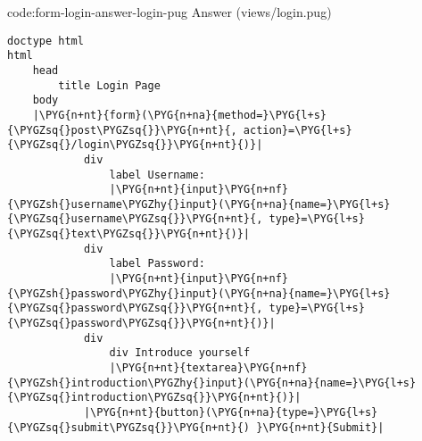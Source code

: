 \begin{code}{code:form-login-answer-login-pug}{ Answer (views/login.pug)}
\begin{verbatim}
doctype html
html
    head
        title Login Page
    body
    |\PYG{n+nt}{form}(\PYG{n+na}{method=}\PYG{l+s}{\PYGZsq{}post\PYGZsq{}}\PYG{n+nt}{, action}=\PYG{l+s}{\PYGZsq{}/login\PYGZsq{}}\PYG{n+nt}{)}|
            div
                label Username:
                |\PYG{n+nt}{input}\PYG{n+nf}{\PYGZsh{}username\PYGZhy{}input}(\PYG{n+na}{name=}\PYG{l+s}{\PYGZsq{}username\PYGZsq{}}\PYG{n+nt}{, type}=\PYG{l+s}{\PYGZsq{}text\PYGZsq{}}\PYG{n+nt}{)}|
            div
                label Password:
                |\PYG{n+nt}{input}\PYG{n+nf}{\PYGZsh{}password\PYGZhy{}input}(\PYG{n+na}{name=}\PYG{l+s}{\PYGZsq{}password\PYGZsq{}}\PYG{n+nt}{, type}=\PYG{l+s}{\PYGZsq{}password\PYGZsq{}}\PYG{n+nt}{)}|
            div
                div Introduce yourself
                |\PYG{n+nt}{textarea}\PYG{n+nf}{\PYGZsh{}introduction\PYGZhy{}input}(\PYG{n+na}{name=}\PYG{l+s}{\PYGZsq{}introduction\PYGZsq{}}\PYG{n+nt}{)}|
            |\PYG{n+nt}{button}(\PYG{n+na}{type=}\PYG{l+s}{\PYGZsq{}submit\PYGZsq{}}\PYG{n+nt}{) }\PYG{n+nt}{Submit}|
\end{verbatim}
\end{code}

